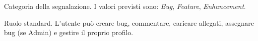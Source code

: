 \begin{description}[style=nextline, leftmargin=3cm, labelwidth=2.8cm]
    \item[Tipo (Type)]
    Categoria della segnalazione. I valori previsti sono: \textit{Bug}, \textit{Feature}, \textit{Enhancement}.

    \item[USER (Utente registrato)]
    Ruolo standard. L'utente può creare bug, commentare, caricare allegati, assegnare bug (se Admin) e gestire il proprio profilo.

\end{description}
